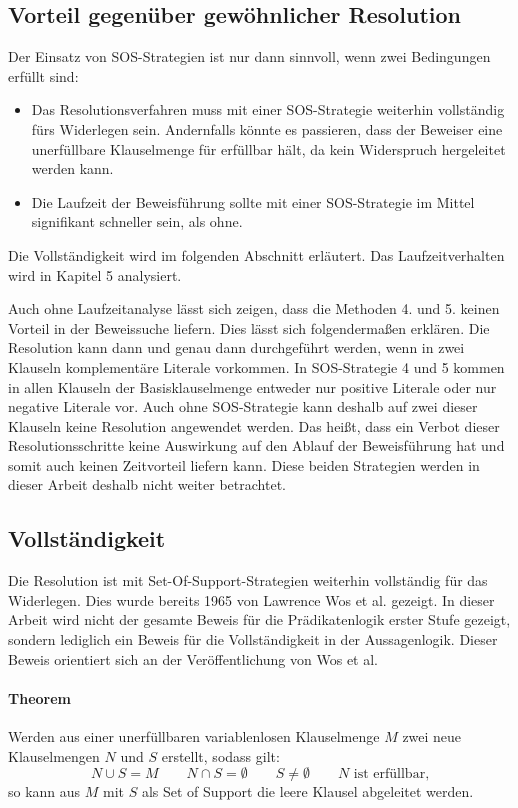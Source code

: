 \subsection{Vorteil gegenüber gewöhnlicher Resolution}
Der Einsatz von SOS-Strategien ist nur dann sinnvoll, wenn zwei Bedingungen erfüllt sind:
\begin{itemize}
	\item Das Resolutionsverfahren muss mit einer SOS-Strategie weiterhin vollständig fürs Widerlegen sein. Andernfalls könnte es passieren, dass der Beweiser eine unerfüllbare Klauselmenge für erfüllbar hält, da kein Widerspruch hergeleitet werden kann.
	\item Die Laufzeit der Beweisführung sollte mit einer SOS-Strategie im Mittel signifikant schneller sein, als ohne.

\end{itemize}
Die Vollständigkeit wird im folgenden Abschnitt erläutert. Das Laufzeitverhalten wird in Kapitel 5 analysiert.

Auch ohne Laufzeitanalyse lässt sich zeigen, dass die Methoden 4. und 5. keinen Vorteil in der Beweissuche liefern. Dies lässt sich folgendermaßen erklären. Die Resolution kann dann und genau dann durchgeführt werden, wenn in zwei Klauseln komplementäre Literale vorkommen. In SOS-Strategie 4 und 5 kommen in allen Klauseln der Basisklauselmenge entweder nur positive Literale oder nur negative Literale vor. Auch ohne SOS-Strategie kann deshalb auf zwei dieser Klauseln keine Resolution angewendet werden. Das heißt, dass ein Verbot dieser Resolutionsschritte keine Auswirkung auf den Ablauf der Beweisführung hat und somit auch keinen Zeitvorteil liefern kann. Diese beiden Strategien werden in dieser Arbeit deshalb nicht weiter betrachtet.

		\subsection{Vollständigkeit}		
Die Resolution ist mit Set-Of-Support-Strategien weiterhin vollständig für das Widerlegen. Dies wurde bereits 1965 von Lawrence Wos et al. gezeigt. In dieser Arbeit wird nicht der gesamte Beweis für die Prädikatenlogik erster Stufe gezeigt, sondern lediglich ein Beweis für die Vollständigkeit in der Aussagenlogik. Dieser Beweis orientiert sich an der Veröffentlichung von Wos et al. \cite{Wos1965Sos}

\paragraph{Theorem} Werden aus einer unerfüllbaren variablenlosen Klauselmenge $M$ zwei neue Klauselmengen $N$ und $S$ erstellt, sodass gilt: 
$$N \cup S = M \quad\quad N \cap S = \emptyset \quad\quad S \neq \emptyset \quad\quad N \text{ ist erfüllbar,}$$
so kann aus $M$ mit $S$ als Set of Support die leere Klausel abgeleitet werden.

